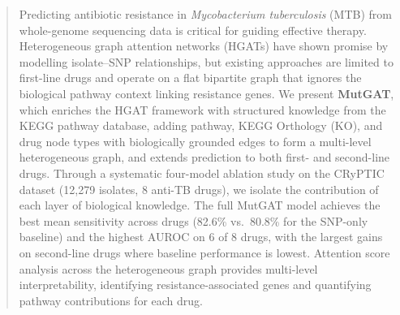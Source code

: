 \documentclass{article}
\theoremstyle{plain}
\theoremstyle{definition}
\theoremstyle{remark}
\begin{document}

\printAffiliationsAndNotice{\icmlEqualContribution}


\begin{abstract}
Predicting antibiotic resistance in \textit{Mycobacterium tuberculosis} (MTB) from whole-genome sequencing data is critical for guiding effective therapy. Heterogeneous graph attention networks (HGATs) have shown promise by modelling isolate--SNP relationships, but existing approaches are limited to first-line drugs and operate on a flat bipartite graph that ignores the biological pathway context linking resistance genes. We present \textbf{MutGAT}, which enriches the HGAT framework with structured knowledge from the KEGG pathway database, adding pathway, KEGG Orthology (KO), and drug node types with biologically grounded edges to form a multi-level heterogeneous graph, and extends prediction to both first- and second-line drugs. Through a systematic four-model ablation study on the CRyPTIC dataset (12{,}279 isolates, 8 anti-TB drugs), we isolate the contribution of each layer of biological knowledge. The full MutGAT model achieves the best mean sensitivity across drugs (82.6\% vs.\ 80.8\% for the SNP-only baseline) and the highest AUROC on 6 of 8 drugs, with the largest gains on second-line drugs where baseline performance is lowest. Attention score analysis across the heterogeneous graph provides multi-level interpretability, identifying resistance-associated genes and quantifying pathway contributions for each drug.
\end{abstract}
\end{document}
